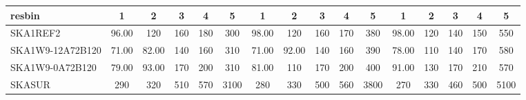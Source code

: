 \begin{table}[!htp]
{{\begin{tabular}{|lccccc||ccccc||ccccc|}
 resbin  &1 & 2 & 3 & 4 & 5 & 1 & 2 & 3 & 4 & 5 & 1 & 2 & 3 & 4 & 5 \tabularnewline \hline
SKA1REF2 & 96.00 \cellcolor{blue!22.79} & 120 \cellcolor{red!24.71} & 160 \cellcolor{green!20.27} & 180 \cellcolor{orange!20.05} & 300 \cellcolor{purple!18.00} & 98.00 \cellcolor{blue!23.43} & 120 \cellcolor{red!22.94} & 160 \cellcolor{green!20.33} & 170 \cellcolor{orange!19.05} & 380 \cellcolor{purple!18.00} & 98.00 \cellcolor{blue!22.37} & 120 \cellcolor{red!19.91} & 140 \cellcolor{green!18.00} & 150 \cellcolor{orange!18.00} & 550 \cellcolor{purple!18.00}\\ \hline 
SKA1W9-12A72B120 & 71.00 \cellcolor{blue!18.00} & 82.00 \cellcolor{red!18.00} & 140 \cellcolor{green!18.00} & 160 \cellcolor{orange!18.00} & 310 \cellcolor{purple!18.15} & 71.00 \cellcolor{blue!18.00} & 92.00 \cellcolor{red!18.00} & 140 \cellcolor{green!18.00} & 160 \cellcolor{orange!18.00} & 390 \cellcolor{purple!18.12} & 78.00 \cellcolor{blue!18.00} & 110 \cellcolor{red!18.00} & 140 \cellcolor{green!18.00} & 170 \cellcolor{orange!20.40} & 580 \cellcolor{purple!18.28}\\ \hline 
SKA1W9-0A72B120 & 79.00 \cellcolor{blue!19.53} & 93.00 \cellcolor{red!19.94} & 170 \cellcolor{green!21.41} & 200 \cellcolor{orange!22.10} & 310 \cellcolor{purple!18.15} & 81.00 \cellcolor{blue!20.01} & 110 \cellcolor{red!21.18} & 170 \cellcolor{green!21.50} & 200 \cellcolor{orange!22.20} & 400 \cellcolor{purple!18.25} & 91.00 \cellcolor{blue!20.84} & 130 \cellcolor{red!21.82} & 170 \cellcolor{green!21.94} & 210 \cellcolor{orange!25.20} & 570 \cellcolor{purple!18.18}\\ \hline 
SKASUR & 290 \cellcolor{blue!60.00} & 320 \cellcolor{red!60.00} & 510 \cellcolor{green!60.00} & 570 \cellcolor{orange!60.00} & 3100 \cellcolor{purple!60.00} & 280 \cellcolor{blue!60.00} & 330 \cellcolor{red!60.00} & 500 \cellcolor{green!60.00} & 560 \cellcolor{orange!60.00} & 3800 \cellcolor{purple!60.00} & 270 \cellcolor{blue!60.00} & 330 \cellcolor{red!60.00} & 460 \cellcolor{green!60.00} & 500 \cellcolor{orange!60.00} & 5100 \cellcolor{purple!60.00}\tabularnewline \hline 
\end{tabular}}\hfil 
{}}
\end{table}
